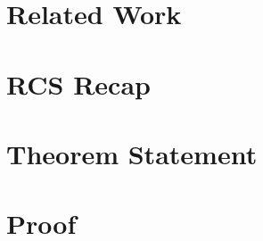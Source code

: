 \documentclass[11pt,a4paper]{article}
\newcommand{\headlip}{L_H}                      %
\newcommand{\encoderlip}{L_\theta}              %
\newcommand{\deplag}{\Delta}                    %
\newcommand{\composite}{\stab^{\mathrm{comp}}}  %
\begin{document}
\section{Related Work}
\label{sec:related}

\section{RCS Recap}
\label{sec:recap}

\section{Theorem Statement}
\label{sec:theorem}

\section{Proof}
\label{sec:proof}
\end{document}
